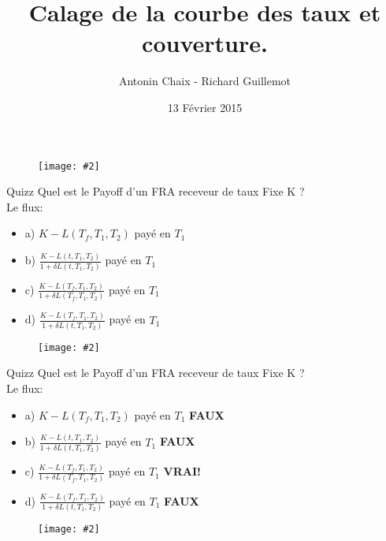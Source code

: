 \documentclass{beamer}
\title[Produits dérivés de taux]{Calage de la courbe des taux et couverture.}
\author{Antonin Chaix - Richard Guillemot}
\institute{Master IFMA}
\date{13 Février 2015}
\newcommand{\FIG}[2]{\texttt{[image: \#2]}}
\begin{document}
\begin{frame}
\titlepage
\begin{figure}[h]
\centering \FIG{5cm}{figures/UPMC_IFMA.jpg}
\end{figure}

\end{frame}

\begin{frame}{Quizz}
Quel est le Payoff d'un FRA receveur de taux Fixe K ?\\
\vspace{0.5cm}
Le flux:
\begin{itemize}
\item a) $K - L(T_f,T_{1},T_{2})$ payé en $T_1$
\item b) $\frac{K - L(t,T_{1},T_{2})}{1+\delta  L(t,T_{1},T_{2})}$ payé en $T_1$
\item c) $\frac{K - L(T_f,T_{1},T_{2})}{1+\delta  L(T_f,T_{1},T_{2})}$ payé en $T_1$
\item d) $\frac{K - L(T_f,T_{1},T_{2})}{1+\delta  L(t,T_{1},T_{2})}$ payé en $T_1$
\end{itemize}
\begin{figure}[h]
\FIG{10cm}{figures/schema_fra.jpg}
\end{figure}
\end{frame}


\begin{frame}{Quizz}
Quel est le Payoff d'un FRA receveur de taux Fixe K ?\\
\vspace{0.5cm}
Le flux:
\begin{itemize}
\item a) $K - L(T_f,T_{1},T_{2})$ payé en $T_1$ \textbf{\color{red}FAUX}
\item b) $\frac{K - L(t,T_{1},T_{2})}{1+\delta  L(t,T_{1},T_{2})}$ payé en $T_1$ \textbf{\color{red}FAUX}
\item c) $\frac{K - L(T_f,T_{1},T_{2})}{1+\delta  L(T_f,T_{1},T_{2})}$ payé en $T_1$ \textbf{\color{green}VRAI!}
\item d) $\frac{K - L(T_f,T_{1},T_{2})}{1+\delta  L(t,T_{1},T_{2})}$ payé en $T_1$ \textbf{\color{red}FAUX}
\end{itemize}
\begin{figure}[h]
\FIG{10cm}{figures/schema_fra.jpg}
\end{figure}

\end{frame}
\end{document}
